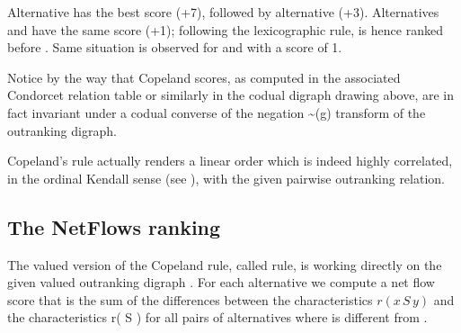 \documentclass[a4paper,10pt,english]{sphinxhowto}
\begin{document}
Alternative  has the best score (+7), followed by alternative  (+3). Alternatives  and  have the same score (+1); following the lexicographic rule,  is hence ranked before . Same situation is observed for  and  with a score of \sphinxhyphen{}1.

Notice by the way that Copeland scores, as computed in the associated Condorcet relation table or similarly in the codual digraph drawing above, are in fact invariant under a codual \sphinxhyphen{} converse of the negation \textasciitilde{}(\sphinxhyphen{}g) \sphinxhyphen{} transform of the outranking digraph.

Copeland’s rule actually renders a linear order which is indeed highly correlated, in the ordinal Kendall sense (see ), with the given pairwise outranking relation.

\begin{sphinxVerbatim}[commandchars=\\\{\},numbers=left,firstnumber=1,stepnumber=1]
  
  \PYG{p}{[}\PYG{p}{]}
\end{sphinxVerbatim}


\subsection{The Net\sphinxhyphen{}Flows ranking}
\label{\detokenize{tutorial:the-net-flows-ranking}}
The valued version of the Copeland rule, called  rule, is working directly on the given valued outranking digraph . For each alternative  we compute a net flow score that is the sum of the differences between the  characteristics \(r(x\,S\,y)\) and the  characteristics r( S ) for all pairs of alternatives where  is different from .
\end{document}
